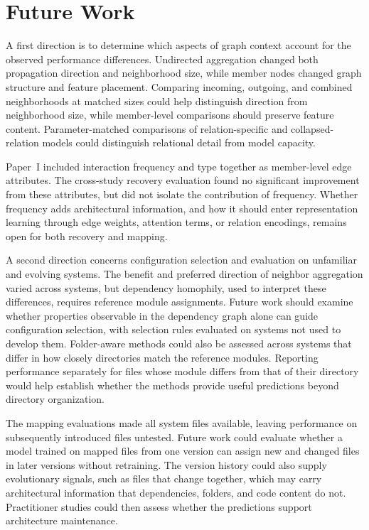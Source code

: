 \section{Future Work~\label{sec:future_work}}
A first direction is to determine which aspects of graph context account for the observed performance differences. Undirected aggregation changed both propagation direction and neighborhood size, while member nodes changed graph structure and feature placement. Comparing incoming, outgoing, and combined neighborhoods at matched sizes could help distinguish direction from neighborhood size, while member-level comparisons should preserve feature content. Parameter-matched comparisons of relation-specific and collapsed-relation models could distinguish relational detail from model capacity.
 
Paper~I included interaction frequency and type together as member-level edge attributes. The cross-study recovery evaluation found no significant improvement from these attributes, but did not isolate the contribution of frequency. Whether frequency adds architectural information, and how it should enter representation learning through edge weights, attention terms, or relation encodings, remains open for both recovery and mapping.
 
A second direction concerns configuration selection and evaluation on unfamiliar and evolving systems. The benefit and preferred direction of neighbor aggregation varied across systems, but dependency homophily, used to interpret these differences, requires reference module assignments. Future work should examine whether properties observable in the dependency graph alone can guide configuration selection, with selection rules evaluated on systems not used to develop them. Folder-aware methods could also be assessed across systems that differ in how closely directories match the reference modules. Reporting performance separately for files whose module differs from that of their directory would help establish whether the methods provide useful predictions beyond directory organization.
 
The mapping evaluations made all system files available, leaving performance on subsequently introduced files untested. Future work could evaluate whether a model trained on mapped files from one version can assign new and changed files in later versions without retraining. The version history could also supply evolutionary signals, such as files that change together, which may carry architectural information that dependencies, folders, and code content do not. Practitioner studies could then assess whether the predictions support architecture maintenance.
